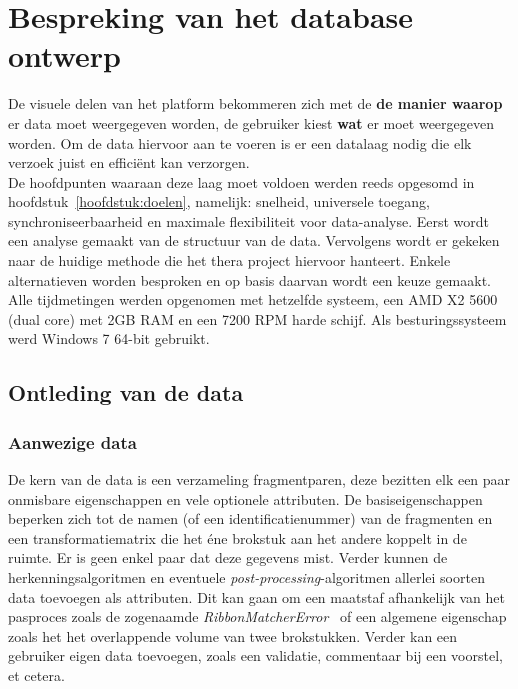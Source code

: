 \chapter{Bespreking van het database ontwerp}
\label{hoofdstuk:database}
De visuele delen van het platform bekommeren zich met de \textbf{de manier waarop} er data moet weergegeven worden, de gebruiker kiest \textbf{wat} er moet weergegeven worden. Om de data hiervoor aan te voeren is er een datalaag nodig die elk verzoek juist en effici\"ent kan verzorgen.\\

De hoofdpunten waaraan deze laag moet voldoen werden reeds opgesomd in hoofdstuk~\ref{hoofdstuk:doelen}, namelijk: snelheid, universele toegang, synchroniseerbaarheid en maximale flexibiliteit voor data-analyse. Eerst wordt een analyse gemaakt van de structuur van de data. Vervolgens wordt er gekeken naar de huidige methode die het thera project hiervoor hanteert. Enkele alternatieven worden besproken en op basis daarvan wordt een keuze gemaakt.\\

Alle tijdmetingen werden opgenomen met hetzelfde systeem, een AMD X2 5600 (dual core) met 2GB RAM en een 7200 RPM harde schijf. Als besturingssysteem werd Windows 7 64-bit gebruikt.

\section{Ontleding van de data}

\subsection{Aanwezige data}
De kern van de data is een verzameling fragmentparen, deze bezitten elk een paar onmisbare eigenschappen en vele optionele attributen. De basiseigenschappen beperken zich tot de namen (of een identificatienummer) van de fragmenten en een transformatiematrix die het \'ene brokstuk aan het andere koppelt in de ruimte. Er is geen enkel paar dat deze gegevens mist. Verder kunnen de herkenningsalgoritmen en eventuele \emph{post-processing}-algoritmen allerlei soorten data toevoegen als attributen. Dit kan gaan om een maatstaf afhankelijk van het pasproces zoals de zogenaamde \emph{RibbonMatcherError}~\cite{Brown2008} of een algemene eigenschap zoals het het overlappende volume van twee brokstukken. Verder kan een gebruiker eigen data toevoegen, zoals een validatie, commentaar bij een voorstel, et cetera.

